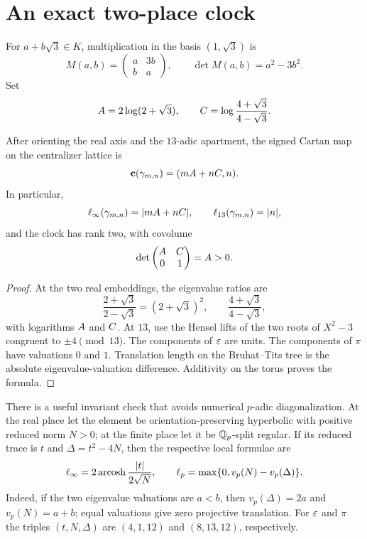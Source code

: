 \section{An exact two-place clock}

For $a+b\sqrt3\in K$, multiplication in the basis $(1,\sqrt3)$ is
\[
M(a,b)=\begin{pmatrix}a&3b\\b&a\end{pmatrix},
\qquad \det M(a,b)=a^2-3b^2.
\]
Set
\[
A=2\log(2+\sqrt3),
\qquad
C=\log\frac{4+\sqrt3}{4-\sqrt3}.
\]

\begin{theorem}\label{thm:joint-clock}
After orienting the real axis and the $13$-adic apartment, the signed Cartan
map on the centralizer lattice is
\[
\mathbf c(\gamma_{m,n})=(mA+nC,n).
\]
In particular,
\[
\ell_{\infty}(\gamma_{m,n})=|mA+nC|,
\qquad
\ell_{13}(\gamma_{m,n})=|n|,
\]
and the clock has rank two, with covolume
\[
\det\begin{pmatrix}A&C\\0&1\end{pmatrix}=A>0.
\]
\end{theorem}

\begin{proof}
At the two real embeddings, the eigenvalue ratios are
\[
\frac{2+\sqrt3}{2-\sqrt3}=(2+\sqrt3)^2,
\qquad
\frac{4+\sqrt3}{4-\sqrt3},
\]
with logarithms $A$ and $C$.  At $13$, use the Hensel lifts of the two
roots of $X^2-3$ congruent to $\pm4\pmod {13}$.  The components of $\varepsilon$
are units.  The components of $\pi$ have valuations $0$ and $1$.
Translation length on the Bruhat--Tits tree is the absolute
eigenvalue-valuation difference.  Additivity on the torus proves the
formula.
\end{proof}

There is a useful invariant check that avoids numerical $p$-adic
diagonalization.  At the real place let the element be
orientation-preserving hyperbolic with positive reduced norm $N>0$; at the
finite place let it be $\mathbb{Q}_p$-split regular.  If its reduced trace is $t$
and $\Delta=t^2-4N$, then the respective local formulae are
\begin{equation}\label{eq:invariant-length}
\ell_{\infty}=2\operatorname{arcosh}\frac{|t|}{2\sqrt N},
\qquad
\ell_p=\max\{0,v_p(N)-v_p(\Delta)\}.
\end{equation}
Indeed, if the two eigenvalue valuations are $a<b$, then
$v_p(\Delta)=2a$ and $v_p(N)=a+b$; equal valuations give zero projective
translation.  For $\varepsilon$ and $\pi$ the triples $(t,N,\Delta)$ are
$(4,1,12)$ and $(8,13,12)$, respectively.

